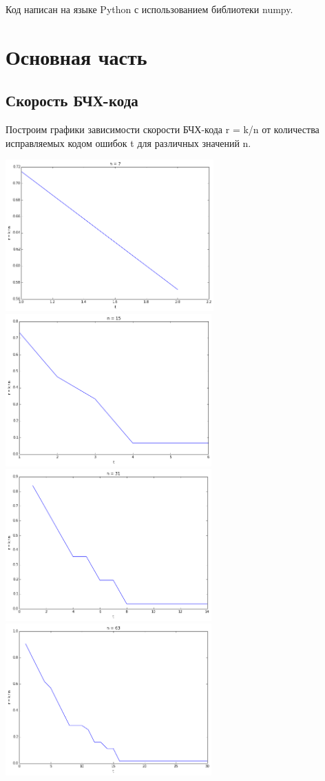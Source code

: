 \documentclass[12pt, a4paper]{article}
\begin{document}
		Код написан на языке Python с использованием библиотеки numpy.

	\newpage
	\section{Основная часть}
		\subsection{Скорость БЧХ-кода}
			Построим графики зависимости скорости БЧХ-кода r = k/n от количества исправляемых кодом ошибок t для различных значений n.

			\begin{center}
				\includegraphics[width=8cm]{n7.png}
				\includegraphics[width=7.9cm]{n15.png}
				\includegraphics[width=7.9cm]{n31.png}
				\includegraphics[width=7.9cm]{n63.png}

\end{center}
\end{document}
